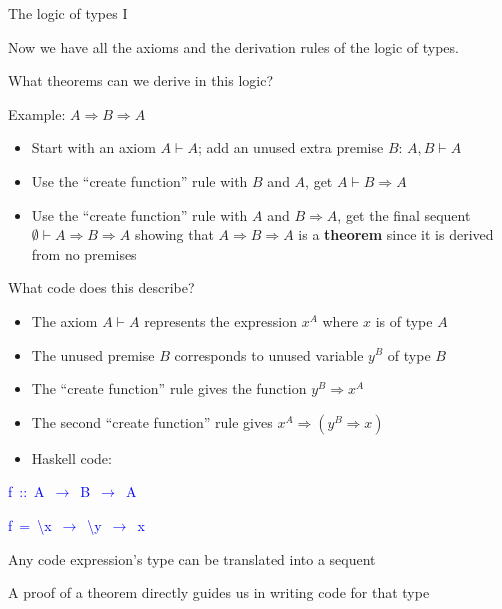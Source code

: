 \documentclass[english]{beamer}
\newenvironment{lyxcode}
   {\par\begin{list}{}{
     \setlength{\rightmargin}{\leftmargin}
     \setlength{\listparindent}{0pt}%
     \raggedright
     \setlength{\itemsep}{0pt}
     \setlength{\parsep}{0pt}
     \normalfont\ttfamily}%
    \def\{{\char`\{}
    \def\}{\char`\}}
    \def\textasciitilde{\char`\~}
    \item[]}
   {\end{list}}
\begin{document}
\begin{frame}{The logic of types I}

Now we have all the axioms and the derivation rules of the logic of
types.
\begin{itemize}
\item What theorems can we derive in this logic?
\item Example: $A\Rightarrow B\Rightarrow A$
\begin{itemize}
\item Start with an axiom $A\vdash A$; add an unused extra premise $B$:
$A,B\vdash A$
\item Use the ``create function'' rule with $B$ and $A$, get $A\vdash B\Rightarrow A$
\item Use the ``create function'' rule with $A$ and $B\Rightarrow A$,
get the final sequent $\emptyset\vdash A\Rightarrow B\Rightarrow A$
showing that $A\Rightarrow B\Rightarrow A$ is a \textbf{theorem}
since it is derived from no premises
\end{itemize}
\item What code does this describe?
\begin{itemize}
\item The axiom $A\vdash A$ represents the expression $x^{A}$ where $x$
is of type $A$
\item The unused premise $B$ corresponds to unused variable $y^{B}$ of
type $B$
\item The ``create function'' rule gives the function $y^{B}\Rightarrow x^{A}$
\item The second ``create function'' rule gives $x^{A}\Rightarrow\left(y^{B}\Rightarrow x\right)$
\item Haskell code:
\end{itemize}
\begin{lyxcode}
\textcolor{blue}{\footnotesize{}f~::~A~$\rightarrow$~B~$\rightarrow$~A}{\footnotesize \par}

\textcolor{blue}{\footnotesize{}f~=~\textbackslash{}x~$\rightarrow$~\textbackslash{}y~$\rightarrow$~x}{\footnotesize \par}
\end{lyxcode}
\item Any code expression's type can be translated into a sequent
\item A proof of a theorem directly guides us in writing code for that type
\end{itemize}
\end{frame}
\end{document}
